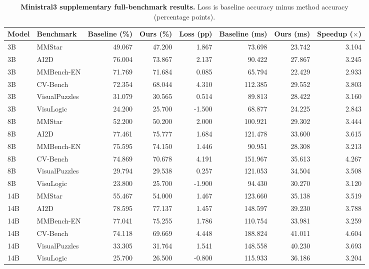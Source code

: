 \documentclass[10pt,a4paper,landscape]{article}
\newcommand{\tnote}[1]{\par\vspace{3pt}{\footnotesize #1}\par}
\begin{document}
\clearpage
\begin{table}[!ht]\centering
\caption{\textbf{Ministral3 supplementary full-benchmark results.} Loss is baseline accuracy minus method accuracy (percentage points).}
\small
\begin{tabular}{@{}llrrrrrr@{}}\toprule
Model & Benchmark & Baseline (\%) & Ours (\%) & Loss (pp) & Baseline (ms) & Ours (ms) & Speedup ($\times$)\\\midrule
3B & MMStar & 49.067 & 47.200 & 1.867 & 73.698 & 23.742 & 3.104\\
3B & AI2D & 76.004 & 73.867 & 2.137 & 90.422 & 27.867 & 3.245\\
3B & MMBench-EN & 71.769 & 71.684 & 0.085 & 65.794 & 22.429 & 2.933\\
3B & CV-Bench & 72.354 & 68.044 & 4.310 & 112.385 & 29.552 & 3.803\\
3B & VisualPuzzles & 31.079 & 30.565 & 0.514 & 89.813 & 28.422 & 3.160\\
3B & VisuLogic & 24.200 & 25.700 & -1.500 & 68.877 & 24.225 & 2.843\\
\midrule
8B & MMStar & 52.200 & 50.200 & 2.000 & 100.921 & 29.302 & 3.444\\
8B & AI2D & 77.461 & 75.777 & 1.684 & 121.478 & 33.600 & 3.615\\
8B & MMBench-EN & 75.595 & 74.150 & 1.446 & 90.951 & 28.308 & 3.213\\
8B & CV-Bench & 74.869 & 70.678 & 4.191 & 151.967 & 35.613 & 4.267\\
8B & VisualPuzzles & 29.794 & 29.538 & 0.257 & 121.053 & 34.504 & 3.508\\
8B & VisuLogic & 23.800 & 25.700 & -1.900 & 94.430 & 30.270 & 3.120\\
\midrule
14B & MMStar & 55.467 & 54.000 & 1.467 & 123.660 & 35.138 & 3.519\\
14B & AI2D & 78.595 & 77.137 & 1.457 & 148.597 & 39.230 & 3.788\\
14B & MMBench-EN & 77.041 & 75.255 & 1.786 & 110.754 & 33.981 & 3.259\\
14B & CV-Bench & 74.118 & 69.669 & 4.448 & 188.824 & 41.011 & 4.604\\
14B & VisualPuzzles & 33.305 & 31.764 & 1.541 & 148.558 & 40.230 & 3.693\\
14B & VisuLogic & 25.700 & 26.500 & -0.800 & 115.933 & 36.186 & 3.204\\
\bottomrule\end{tabular}
\tnote{The frozen configuration uses 336-pixel inputs, full prompts and all layers, derived mixed precision, QKV fusion, and vision graph execution. Request-stream timing includes initial capture and request-time compilation; model loading and weight preparation are separate. Each request recomputes visual features. This does not isolate same-precision operator gains. MMBench-EN uses provided-pass group accuracy, not full official CircularEval; 53 groups are incomplete. CV-Bench uses source-balanced accuracy; the other benchmarks use forced-choice exact accuracy. Three repetitions are timing replicates, not independent training seeds.}
\end{table}
\end{document}
